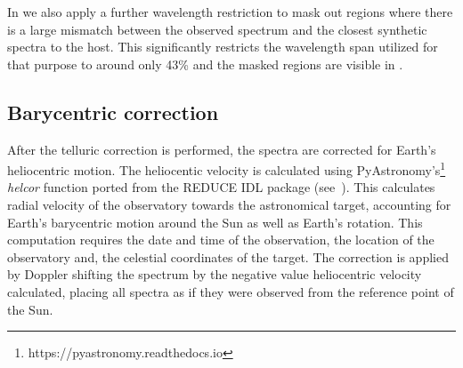 In  we also apply a further wavelength restriction to mask out regions where there is a large mismatch between the observed spectrum and the closest synthetic spectra to the host. This significantly restricts the wavelength span utilized for that purpose to around only 43\% and the masked regions are visible in . 




\subsection{Barycentric correction}
After the telluric correction is performed, the spectra are corrected for Earth's heliocentric motion. The heliocentic velocity is calculated using PyAstronomy's\footnote{https://pyastronomy.readthedocs.io} \emph{helcor} function ported from the REDUCE IDL package (see~\citet[][]{piskunov_new_2002}). This calculates radial velocity of the observatory towards the astronomical target, accounting for Earth's barycentric motion around the Sun as well as Earth's rotation. This computation requires the date and time of the observation, the location of the observatory and, the celestial coordinates of the target.
The correction is applied by Doppler shifting the spectrum by the negative value heliocentric velocity calculated, placing all spectra as if they were observed from the reference point of the Sun.
